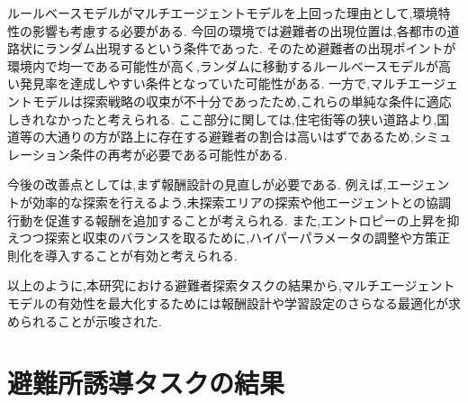 ルールベースモデルがマルチエージェントモデルを上回った理由として,環境特性の影響も考慮する必要がある.
今回の環境では避難者の出現位置は,各都市の道路状にランダム出現するという条件であった.
そのため避難者の出現ポイントが環境内で均一である可能性が高く,ランダムに移動するルールベースモデルが高い発見率を達成しやすい条件となっていた可能性がある.
一方で,マルチエージェントモデルは探索戦略の収束が不十分であったため,これらの単純な条件に適応しきれなかったと考えられる.
ここ部分に関しては,住宅街等の狭い道路より,国道等の大通りの方が路上に存在する避難者の割合は高いはずであるため,シミュレーション条件の再考が必要である可能性がある.

今後の改善点としては,まず報酬設計の見直しが必要である.
例えば,エージェントが効率的な探索を行えるよう,未探索エリアの探索や他エージェントとの協調行動を促進する報酬を追加することが考えられる.
また,エントロピーの上昇を抑えつつ探索と収束のバランスを取るために,ハイパーパラメータの調整や方策正則化を導入することが有効と考えられる.

以上のように,本研究における避難者探索タスクの結果から,マルチエージェントモデルの有効性を最大化するためには報酬設計や学習設定のさらなる最適化が求められることが示唆された.

\section{避難所誘導タスクの結果}
